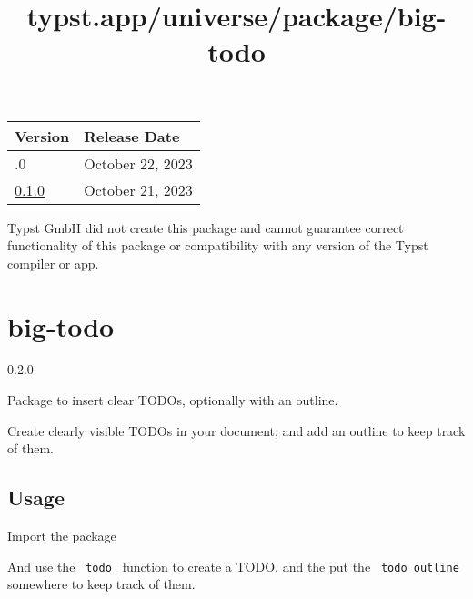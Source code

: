\begin{longtable}[]{@{}ll@{}}
\toprule\noalign{}
Version & Release Date \\
\midrule\noalign{}
\endhead
\bottomrule\noalign{}
\endlastfoot
0.2.0 & October 22, 2023 \\
\href{https://typst.app/universe/package/ionio-illustrate/0.1.0/}{0.1.0}
& October 21, 2023 \\
\end{longtable}

Typst GmbH did not create this package and cannot guarantee correct
functionality of this package or compatibility with any version of the
Typst compiler or app.


\title{typst.app/universe/package/big-todo}

\label{banner}
\section{big-todo}\label{big-todo}

{ 0.2.0 }

Package to insert clear TODOs, optionally with an outline.

\label{readme}
Create clearly visible TODOs in your document, and add an outline to
keep track of them.

\subsection{Usage}\label{usage}

Import the package

\begin{Shaded}
\begin{Highlighting}[]
\end{Highlighting}
\end{Shaded}

And use the \texttt{\ todo\ } function to create a TODO, and the put the
\texttt{\ todo\_outline\ } somewhere to keep track of them.

